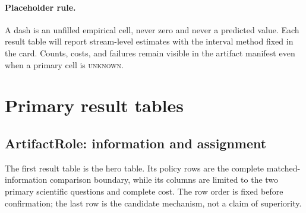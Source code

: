 \documentclass[sigconf,anonymous]{aamas}
\newcommand{\unknown}{\textsc{unknown}}
\begin{document}
\paragraph{Placeholder rule.} A dash is an unfilled empirical cell, never zero and never a predicted value. Each result table will report stream-level estimates with the interval method fixed in the card. Counts, costs, and failures remain visible in the artifact manifest even when a primary cell is \unknown{}.

\section{Primary result tables}

\subsection{ArtifactRole: information and assignment}

The first result table is the hero table. Its policy rows are the complete matched-information comparison boundary, while its columns are limited to the two primary scientific questions and complete cost. The row order is fixed before confirmation; the last row is the candidate mechanism, not a claim of superiority.
\end{document}
